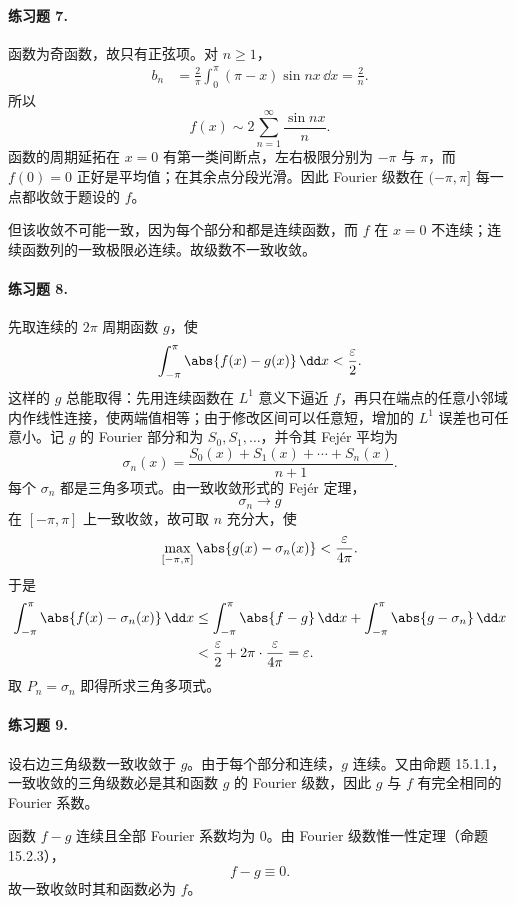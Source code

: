 \paragraph{练习题 7.}
\begin{xsolution}
函数为奇函数，故只有正弦项。对 $n\ge1$，
\begin{align*}
  b_n
  &=\frac2\pi\int_0^\pi(\pi-x)\sin nx\,\dd x
  =\frac2n.
\end{align*}
所以
\[
  \boxed{\displaystyle
  f(x)\sim2\sum_{n=1}^{\infty}\frac{\sin nx}{n}}.
\]
函数的周期延拓在 $x=0$ 有第一类间断点，左右极限分别为 $-\pi$ 与 $\pi$，而 $f(0)=0$ 正好是平均值；在其余点分段光滑。因此 Fourier 级数在 $(-\pi,\pi]$ 每一点都收敛于题设的 $f$。

但该收敛不可能一致，因为每个部分和都是连续函数，而 $f$ 在 $x=0$ 不连续；连续函数列的一致极限必连续。故级数不一致收敛。
\end{xsolution}

\paragraph{练习题 8.}
\begin{xsolution}
先取连续的 $2\pi$ 周期函数 $g$，使
\[
  \int_{-\pi}^{\pi}\abs{f(x)-g(x)}\,\dd x<\frac\varepsilon2.
\]
这样的 $g$ 总能取得：先用连续函数在 $L^1$ 意义下逼近 $f$，再只在端点的任意小邻域内作线性连接，使两端值相等；由于修改区间可以任意短，增加的 $L^1$ 误差也可任意小。记 $g$ 的 Fourier 部分和为 $S_0,S_1,\ldots$，并令其 Fejér 平均为
\[
  \sigma_n(x)=\frac{S_0(x)+S_1(x)+\cdots+S_n(x)}{n+1}.
\]
每个 $\sigma_n$ 都是三角多项式。由一致收敛形式的 Fejér 定理，
\[
  \sigma_n\to g
\]
在 $[-\pi,\pi]$ 上一致收敛，故可取 $n$ 充分大，使
\[
  \max_{[-\pi,\pi]}\abs{g(x)-\sigma_n(x)}
  <\frac{\varepsilon}{4\pi}.
\]
于是
\begin{align*}
  \int_{-\pi}^{\pi}\abs{f(x)-\sigma_n(x)}\,\dd x
  &\le\int_{-\pi}^{\pi}\abs{f-g}\,\dd x
   +\int_{-\pi}^{\pi}\abs{g-\sigma_n}\,\dd x\\
  &<\frac\varepsilon2+2\pi\cdot\frac{\varepsilon}{4\pi}
  =\varepsilon.
\end{align*}
取 $P_n=\sigma_n$ 即得所求三角多项式。
\end{xsolution}

\paragraph{练习题 9.}
\begin{xsolution}
设右边三角级数一致收敛于 $g$。由于每个部分和连续，$g$ 连续。又由命题 15.1.1，一致收敛的三角级数必是其和函数 $g$ 的 Fourier 级数，因此 $g$ 与 $f$ 有完全相同的 Fourier 系数。

函数 $f-g$ 连续且全部 Fourier 系数均为 $0$。由 Fourier 级数惟一性定理（命题 15.2.3），
\[
  f-g\equiv0.
\]
故一致收敛时其和函数必为 $f$。
\end{xsolution}

